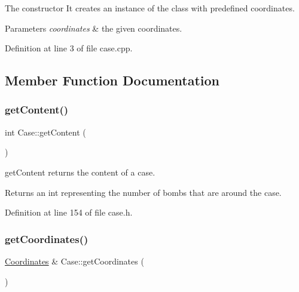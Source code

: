 The constructor It creates an instance of the class with predefined coordinates. 


\begin{DoxyParams}{Parameters}
{\em coordinates} & the given coordinates. \\
\hline
\end{DoxyParams}


Definition at line 3 of file case.\+cpp.



\subsection{Member Function Documentation}
\mbox{\label{class_case_aa338c578e65412f867a89733c75863a7}} 
\subsubsection{\texorpdfstring{get\+Content()}{getContent()}}
{\footnotesize\ttfamily int Case\+::get\+Content (\begin{DoxyParamCaption}{ }\end{DoxyParamCaption})\hspace{0.3cm}{\ttfamily [inline]}}



get\+Content returns the content of a case. 

\begin{DoxyReturn}{Returns}
an int representing the number of bombs that are around the case. 
\end{DoxyReturn}


Definition at line 154 of file case.\+h.

\mbox{\label{class_case_a6a95d5189d914c65d7a4db0f007ff533}} 
\subsubsection{\texorpdfstring{get\+Coordinates()}{getCoordinates()}}
{\footnotesize\ttfamily \hyperlink{struct_coordinates}{Coordinates} \& Case\+::get\+Coordinates (\begin{DoxyParamCaption}{ }\end{DoxyParamCaption})\hspace{0.3cm}{\ttfamily [inline]}}



